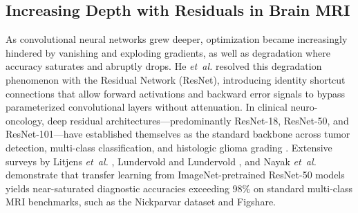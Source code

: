 ﻿\documentclass[journal]{IEEEtran}
\begin{document}
\subsection{Increasing Depth with Residuals in Brain MRI}
As convolutional neural networks grew deeper, optimization became increasingly hindered by vanishing and exploding gradients, as well as degradation where accuracy saturates and abruptly drops. He \emph{et~al.} \cite{14} resolved this degradation phenomenon with the Residual Network (ResNet), introducing identity shortcut connections that allow forward activations and backward error signals to bypass parameterized convolutional layers without attenuation. In clinical neuro-oncology, deep residual architectures---predominantly ResNet-18, ResNet-50, and ResNet-101---have established themselves as the standard backbone across tumor detection, multi-class classification, and histologic glioma grading \cite{10, 38, 54, 55}. Extensive surveys by Litjens \emph{et~al.} \cite{10}, Lundervold and Lundervold \cite{54}, and Nayak \emph{et~al.} \cite{55} demonstrate that transfer learning from ImageNet-pretrained ResNet-50 models yields near-saturated diagnostic accuracies exceeding 98\% on standard multi-class MRI benchmarks, such as the Nickparvar dataset \cite{34} and Figshare.
\end{document}
